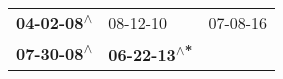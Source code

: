 \begin{supertabular}{lll}
 \textbf{04-02-08\textsuperscript{$\wedge$}} &                    08-12-10\textsuperscript{} &  07-08-16\textsuperscript{} \\
 \textbf{07-30-08\textsuperscript{$\wedge$}} &  \textbf{06-22-13\textsuperscript{$\wedge$*}} &                             \\
\end{supertabular}
